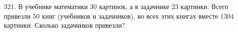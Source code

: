 321. В учебнике математики 30 картинок, а в задачнике 23 картинки. Всего привезли 50 книг (учебников и задачников), во всех этих книгах вместе 1304 картинки.
Сколько задачников привезли?\\
